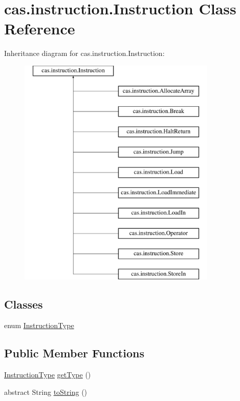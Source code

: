 \hypertarget{classcas_1_1instruction_1_1_instruction}{\section{cas.\-instruction.\-Instruction Class Reference}
\label{classcas_1_1instruction_1_1_instruction}
}
Inheritance diagram for cas.\-instruction.\-Instruction\-:\begin{figure}[H]
\begin{center}
\leavevmode
\includegraphics[height=11.000000cm]{classcas_1_1instruction_1_1_instruction}
\end{center}
\end{figure}
\subsection*{Classes}
\begin{DoxyCompactItemize}
\item 
enum \hyperlink{enumcas_1_1instruction_1_1_instruction_1_1_instruction_type}{Instruction\-Type}
\end{DoxyCompactItemize}
\subsection*{Public Member Functions}
\begin{DoxyCompactItemize}
\item 
\hyperlink{enumcas_1_1instruction_1_1_instruction_1_1_instruction_type}{Instruction\-Type} \hyperlink{classcas_1_1instruction_1_1_instruction_a3601b86fad06112c33f9e7b172e7f8f1}{get\-Type} ()
\item 
abstract String \hyperlink{classcas_1_1instruction_1_1_instruction_a7992edd8d79e1a4e82fb44f4c9abacf9}{to\-String} ()
\end{DoxyCompactItemize}


